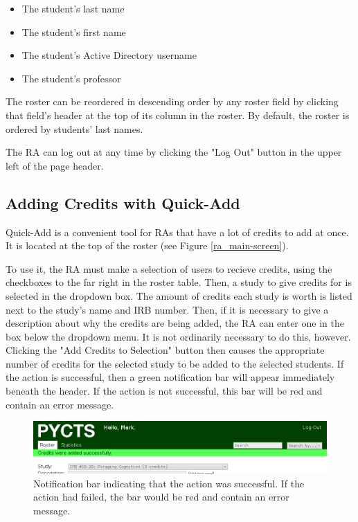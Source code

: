 \documentclass[letterpaper,titlepage]{article}
\begin{document}
\begin{itemize}
\item{The student's last name}
\item{The student's first name}
\item{The student's Active Directory username}
\item{The student's professor}
\end{itemize}

The roster can be reordered in descending order by any roster field by clicking that field's header at the top of its column in the roster. By default, the roster is ordered by students' last names.

The RA can log out at any time by clicking the "Log Out" button in the upper left of the page header.

\subsection{Adding Credits with Quick-Add}
Quick-Add is a convenient tool for RAs that have a lot of credits to add at once. It is located at the top of the roster (see Figure \ref{ra_main-screen}).

To use it, the RA must make a selection of users to recieve credits, using the checkboxes to the far right in the roster table. Then, a study to give credits for is selected in the dropdown box. The amount of credits each study is worth is listed next to the study's name and IRB number. Then, if it is necessary to give a description about why the credits are being added, the RA can enter one in the box below the dropdown menu. It is not ordinarily necessary to do this, however. Clicking the "Add Credits to Selection" button then causes the appropriate number of credits for the selected study to be added to the selected students. If the action is successful, then a green notification bar will appear immediately beneath the header. If the action is not successful, this bar will be red and contain an error message.

\begin{figure}[H]
\includegraphics[width=\textwidth]{images/ra_quick-add-success.png}
\caption{Notification bar indicating that the action was successful. If the action had failed, the bar would be red and contain an error message.}
\label{ra_quick-add-success}
\end{figure}
\end{document}
